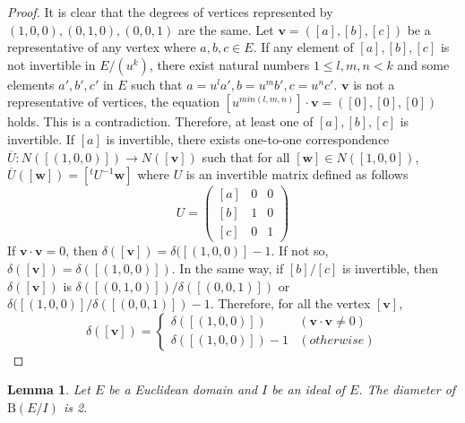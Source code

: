 \documentclass{article}
\newtheorem{Lem}{Lemma}
\newcommand{\B}{\mathrm{B}}
\begin{document}
\begin{proof}
It is clear that the degrees of vertices represented by $(1,0,0), (0,1,0), (0,0,1)$ are the same.
Let ${\bm v} = ([a],[b],[c])$ be a representative of any vertex where $a,b,c \in E$. 
If any element of $[a],[b],[c]$ is not invertible in $E/(u^k)$, 
there exist natural numbers $1 \leq l,m,n < k$ and some elements $a',b',c'$ in $E$ such that $a=u^l a', b=u^m b', c=u^n c'$. ${\bm v}$ is not a representative of vertices, the equation  $[u^{min(l,m,n)}] \cdot {\bm v} = ([0],[0],[0])$ holds. 
This is a contradiction.
Therefore, at least one of $[a],[b],[c]$ is invertible.
If $[a]$ is invertible, there exists one-to-one correspondence $\overline{U}: N([(1,0,0)])  \rightarrow N([{\bm v}])$ such that for all $[{\bm w}] \in N([1,0,0])$, $\overline{U}([\bm w]) = [ {}^t\!U^{-1} {\bm w} ]$ where $U$ is an invertible matrix defined as follows
\[
 U = \left(
 \begin{matrix}
  [a] & 0 & 0 \\
  [b] & 1 & 0 \\
  [c] & 0 & 1
 \end{matrix} \right)
\]
If ${\bm v} \cdot {\bm v} = 0$, then $\delta([\bm v]) = \delta([(1,0,0)] - 1$. If not so, $\delta([\bm v]) = \delta([(1,0,0)])$.
In the same way, if $[b]/[c]$ is invertible, then $\delta([\bm v])$ is $\delta([(0,1,0)])/\delta([(0,0,1)])$ or $\delta([(1,0,0)]/\delta([(0,0,1)]) - 1$.
Therefore, for all the vertex $[{\bm v}]$, 
\[ \delta([\bm v]) = \left\{ \begin{array}{ll}
    \delta([(1,0,0)]) & ({\bm v} \cdot {\bm v} \neq 0) \\
    \delta([(1,0,0)]) - 1 & (otherwise) 
    \end{array}\right.
\]

\end{proof}

\begin{Lem}\label{Lem:diameter}
Let $E$ be a Euclidean domain and $I$ be an ideal of $E$. The diameter of $\B(E/I)$ is 2.
\end{Lem}
\end{document}
